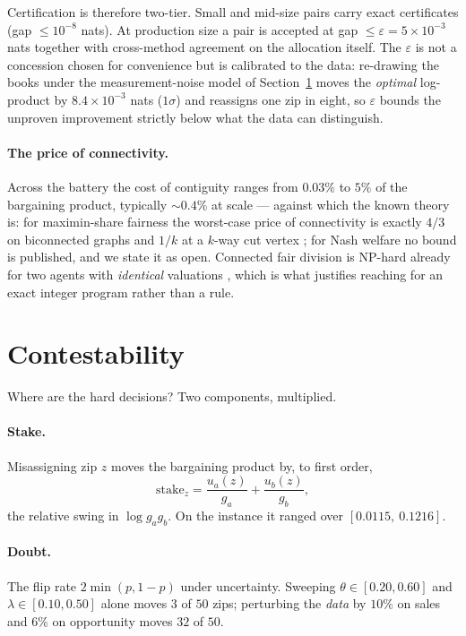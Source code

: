 \documentclass[11pt]{article}
\theoremstyle{remark}\newtheorem*{remark}{Remark}
\begin{document}
Certification is therefore two-tier. Small and mid-size pairs carry exact certificates
(gap $\le10^{-8}$ nats). At production size a pair is accepted at gap
$\le\varepsilon=5\times10^{-3}$ nats together with cross-method agreement on the
allocation itself. The $\varepsilon$ is not a concession chosen for convenience but is
calibrated to the data: re-drawing the books under the measurement-noise model of
Section~\ref{sec:contest} moves the \emph{optimal} log-product by $8.4\times10^{-3}$
nats ($1\sigma$) and reassigns one zip in eight, so $\varepsilon$ bounds the
unproven improvement strictly below what the data can distinguish.

\paragraph{The price of connectivity.} Across the battery the cost of contiguity ranges
from $0.03\%$ to $5\%$ of the bargaining product, typically $\sim$$0.4\%$ at scale ---
against which the known theory is: for maximin-share fairness the worst-case price of
connectivity is exactly $4/3$ on biconnected graphs and $1/k$ at a $k$-way cut vertex
\citep{bei2022}; for Nash welfare no bound is published, and we state it as open.
Connected fair division is NP-hard already for two agents with \emph{identical}
valuations \citep{deligkas2021}, which is what justifies reaching for an exact integer
program rather than a rule.

\section{Contestability}\label{sec:contest}
Where are the hard decisions? Two components, multiplied.

\paragraph{Stake.} Misassigning zip $z$ moves the bargaining product by, to first order,
\begin{equation}
\text{stake}_z=\frac{u_a(z)}{g_a}+\frac{u_b(z)}{g_b},
\end{equation}
the relative swing in $\log g_ag_b$. On the instance it ranged over
$[0.0115,\ 0.1216]$.

\paragraph{Doubt.} The flip rate $2\min(p,1-p)$ under uncertainty. Sweeping
$\theta\in[0.20,0.60]$ and $\lambda\in[0.10,0.50]$ alone moves $3$ of $50$ zips;
perturbing the \emph{data} by $10\%$ on sales and $6\%$ on opportunity moves $32$ of
$50$.
\end{document}
